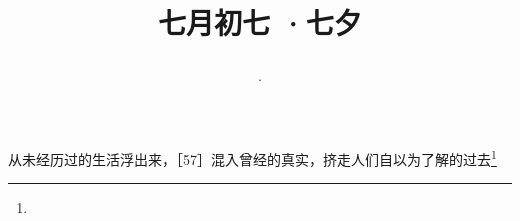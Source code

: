 \title{\date[d=10,m=8,y=2024][year:cn-y,年,month:cn,day:cn,日,·,weekday]·七月初七 ·七夕}
从未经历过的生活浮出来，［57］混入曾经的真实，挤走人们自以为了解的过去\footnote{ }

